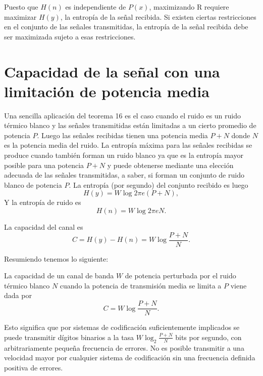 Puesto que $H(n)$ es independiente de $P(x)$, maximizando R requiere
maximizar $H(y)$, la entrop\'ia de la se\~nal recibida. Si existen
ciertas restricciones en el conjunto de las se\~nales transmitidas, la
entrop\'ia de la se\~nal recibida debe ser maximizada sujeto a esas
restricciones.
	
\clearpage

\chapter{Capacidad de la se\~nal  con una limitaci\'on de potencia media}
\label{sec:25}

Una sencilla aplicaci\'on del teorema 16 es el caso cuando el ruido es
un ruido t\'ermico blanco y las se\~nales transmitidas est\'an
limitadas a un cierto promedio de potencia $P$. Luego las se\~nales
recibidas tienen una potencia media $P + N$ donde $N$ es la potencia
media del ruido. La entrop\'ia m\'axima para las se\~nales recibidas
se produce cuando tambi\'en forman un ruido blanco ya que es la
entrop\'ia mayor posible para una potencia $P + N$ y puede obtenerse
mediante una elecci\'on adecuada de las se\~nales transmitidas, a
saber, si forman un conjunto de ruido blanco de potencia $P$. La
entrop\'ia (por segundo) del conjunto recibido es luego
\begin{equation}
H(y) = W\log 2\pi e(P+N),
\end{equation}
Y la entrop\'ia de ruido es
\begin{equation}
H(n) = W\log 2\pi eN.
\end{equation}
	
La capacidad del canal es
\begin{equation}
C = H(y) - H(n) = W\log \frac{P + N}{N}.
\end{equation}
	
Resumiendo tenemos lo siguiente:

\begin{theorem}
\label{th:17}	
La capacidad de un canal de banda $W$ de potencia perturbada por el
ruido t\'ermico blanco $N$ cuando la potencia de transmisi\'on media
se limita a $P$ viene dada por
\begin{equation}
C = W\log \frac{P + N}{N}.
\end{equation}
\end{theorem}
	
Esto significa que por sistemas de codificaci\'on suficientemente
implicados se puede transmitir d\'igitos binarios a la tasa
$W \log_{2}\frac{P + N}{N}$ bits por segundo, con arbitrariamente
peque\~na frecuencia de errores. No es posible transmitir a una
velocidad mayor por cualquier sistema de codificaci\'on sin una
frecuencia definida positiva de errores.
	
